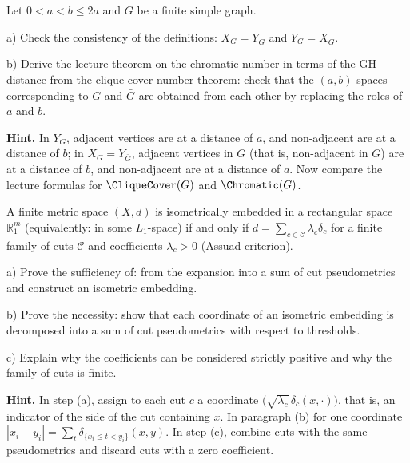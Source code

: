 \documentclass[a4paper,12pt]{report}
\begin{document}
\begin{task}
Let $0<a<b\le2a$ and $G$ be a finite simple graph.

\textup{a)} Check the consistency of the definitions\textup{:} $X_G=Y_{\bar G}$ and $Y_G=X_{\bar G}$.

\textup{b)} Derive the lecture theorem on the chromatic number in terms of the GH-distance from the clique cover number theorem\textup{:} check that the $(a,b)$-spaces corresponding to $G$ and $\bar G$ are obtained from each other by replacing the roles of $a$ and $b$.

\textbf{Hint.} In $Y_G$, adjacent vertices are at a distance of $a$, and non-adjacent are at a distance of $b$\textup{;} in $X_G=Y_{\bar G}$, adjacent vertices in $G$ (that is, non-adjacent in $\bar G$) are at a distance of $b$, and non-adjacent are at a distance of $a$. Now compare the lecture formulas for $\CliqueCover(G)$ and $\Chromatic(G)$.
\end{task}

\begin{task}
A finite metric space $(X,d)$ is isometrically embedded in a rectangular space $\mathbb R^m_1$ (equivalently\textup{:} in some $L_1$-space) if and only if $d=\sum_{c\in\mathcal C}\lambda_c\delta_c$ for a finite family of cuts $\mathcal C$ and coefficients $\lambda_c>0$ (Assuad criterion).

\textup{a)} Prove the sufficiency of\textup{:} from the expansion into a sum of cut pseudometrics and construct an isometric embedding.

\textup{b)} Prove the necessity\textup{:} show that each coordinate of an isometric embedding is decomposed into a sum of cut pseudometrics with respect to thresholds.

\textup{c)} Explain why the coefficients can be considered strictly positive and why the family of cuts is finite.

\textbf{Hint.} In step \textup{(a)}, assign to each cut $c$ a coordinate $\bigl(\sqrt{\lambda_c}\,\delta_{c}(x,\cdot)\bigr)$, that is, an indicator of the side of the cut containing $x$. In paragraph \textup{(b)} for one coordinate $|x_i-y_i|=\sum_{t}\delta_{\{x_i\le t<y_i\}}(x,y)$. In step \textup{(c)}, combine cuts with the same pseudometrics and discard cuts with a zero coefficient.
\end{task}
\end{document}
